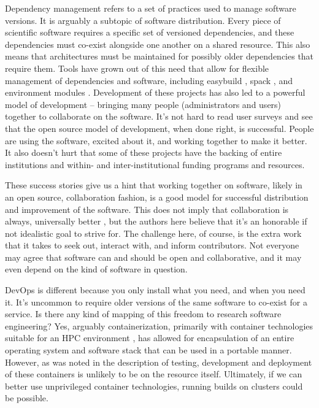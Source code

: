 Dependency management refers to a set of practices used to manage software versions. It is arguably a subtopic of software distribution. Every piece of scientific software requires a specific set of versioned dependencies, and these dependencies must co-exist alongside one another on a shared resource. This also means that architectures must be maintained for possibly older dependencies that require them. Tools have grown out of this need that allow for flexible management of dependencies and software, including easybuild \cite{easybuild}, spack \cite{spack}, and environment modules \cite{LMOD,environment-modules}. Development of these projects has also led to a powerful model of development -- bringing many people (administrators and users) together to collaborate on the software. It's not hard to read user surveys \cite{spack-user-survey} and see that the open source model of development, when done right, is successful. People are using the software, excited about it, and working together to make it better. It also doesn't hurt that some of these projects have the backing of entire institutions and within- and inter-institutional funding programs and resources.

These success stories give us a hint that working together on software, likely in an open source, collaboration fashion, is a good model for successful distribution and improvement of the software.
This does not imply that collaboration is always, universally better \cite{noauthor_undated-bo}, but the authors here believe that it's an honorable if not idealistic goal to strive for.
The challenge here, of course, is the extra work that it takes to seek out, interact with, and inform contributors. Not everyone may agree that software can and should be open and collaborative, and it may even depend on the kind of software in question.

DevOps is different because you only install what you need, and when you need it.
It's uncommon to require older versions of the same software to co-exist for a service. Is there any kind of mapping of this freedom to research software engineering? Yes, arguably containerization, primarily with container technologies suitable for an HPC environment \cite{singularity,charlie,shifter}, has allowed for encapsulation of an entire operating system and software stack that can be used in a portable manner. However, as was noted in the description of testing, development and deployment of these containers is unlikely to be on the resource itself. Ultimately, if we can better use unprivileged container technologies, running builds on clusters could be possible.

